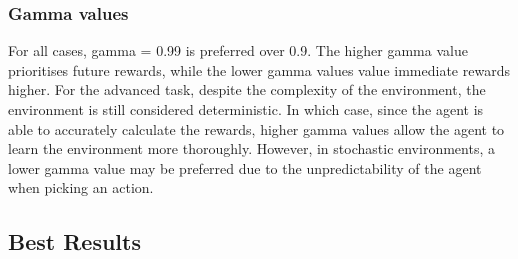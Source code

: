 \subsubsection{Gamma values}
For all cases, gamma = 0.99 is preferred over 0.9. The higher gamma value prioritises future rewards, while the lower gamma values value immediate rewards higher. For the advanced task, despite the complexity of the environment, the environment is still considered deterministic. In which case, since the agent is able to accurately calculate the rewards, higher gamma values allow the agent to learn the environment more thoroughly. However, in stochastic environments, a lower gamma value may be preferred due to the unpredictability of the agent when picking an action.

\subsection{Best Results}
